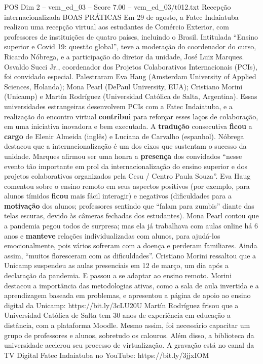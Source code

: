 \begin{textsample}{POS Dim 2 – vem\_ed\_03 – Score 7.00 – vem\_ed\_03/t012.txt}  \label{ex:f2_pos_130}
Recepção internacionalizada BOAS PRÁTICAS Em 29 de agosto, a Fatec Indaiatuba realizou uma recepção virtual aos estudantes de Comércio Exterior, com professores de instituições de quatro países, incluindo o Brasil.
Intitulada “Ensino superior e Covid 19: questão global”, teve a moderação do coordenador do curso, Ricardo Nóbrega, e a participação do diretor da unidade, José Luiz Marques.
Osvaldo Succi Jr., coordenador dos Projetos Colaborativos Internacionais (PCIs), foi convidado especial.
Palestraram Eva Haug (Amsterdam University of Applied Sciences, Holanda); Mona Pearl (DePaul University, EUA); Cristiano Morini (Unicamp) e Martín Rodríguez (Universidad Católica de Salta, Argentina).
Essas universidades estrangeiras desenvolvem PCIs com a Fatec Indaiatuba, e a realização do encontro virtual \textbf{contribui} para reforçar esses laços de colaboração, em uma iniciativa inovadora e bem executada.
A \textbf{tradução} consecutiva \textbf{ficou} a \textbf{cargo} de Elenir Almeida (inglês) e Luciana de Carvalho (espanhol).
Nóbrega destacou que a internacionalização é um dos eixos que sustentam o sucesso da unidade.
Marques afirmou ser uma honra a \textbf{presença} dos convidados “nesse evento tão importante em prol da internacionalização do ensino superior e dos projetos colaborativos organizados pela Cesu / Centro Paula Souza”.
Eva Haug comentou sobre o ensino remoto em seus aspectos positivos (por exemplo, para alunos tímidos \textbf{ficou} mais fácil interagir) e negativos (dificuldades para a \textbf{motivação} dos alunos; professores sentindo que “falam para zumbis” diante das telas escuras, devido às câmeras fechadas dos estudantes).
Mona Pearl contou que a pandemia pegou todos de surpresa; mas ela já trabalhava com aulas online há 6 anos e \textbf{manteve} relações individualizadas com alunos, para ajudá-los emocionalmente, pois vários sofreram com a doença e perderam familiares.
Ainda assim, “muitos floresceram com as dificuldades”.
Cristiano Morini ressaltou que a Unicamp suspendeu as aulas presenciais em 12 de março, um dia após a declaração da pandemia.
E passou a se adaptar ao ensino remoto.
Morini destacou a importância das metodologias ativas, como a sala de aula invertida e a aprendizagem baseada em problemas, e apresentou a página de apoio ao ensino digital da Unicamp: https://bit.ly/3cLU20U Martín Rodríguez frisou que a Universidad Católica de Salta tem 30 anos de experiência em educação a distância, com a plataforma Moodle.
Mesmo assim, foi necessário capacitar um grupo de professores e alunos, sobretudo os calouros.
Além disso, a biblioteca da universidade acelerou seu processo de virtualização.
A gravação está no canal da TV Digital Fatec Indaiatuba no YouTube: https://bit.ly/3jjxIOM

\end{textsample}
